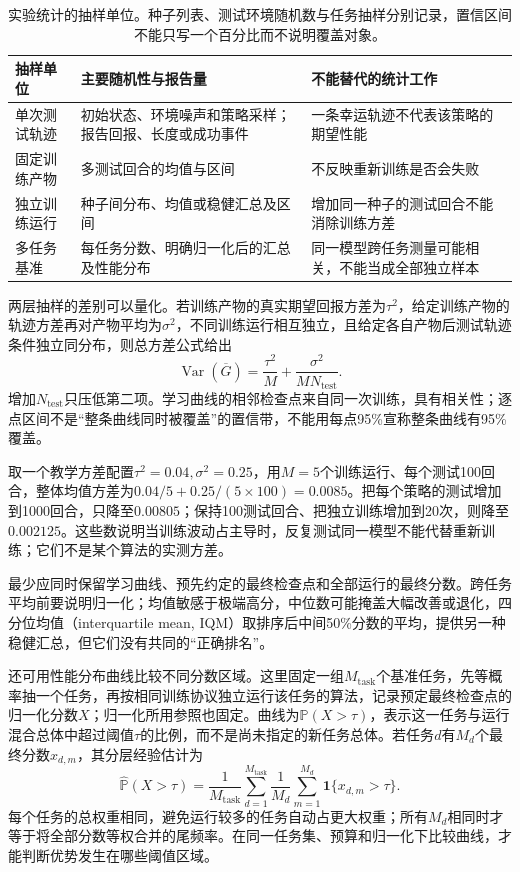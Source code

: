 \begin{table}[t]
  \centering
  \small
  \begin{tabularx}{\linewidth}{>{\raggedright\arraybackslash}p{26mm} >{\raggedright\arraybackslash}X >{\raggedright\arraybackslash}X}
    \toprule
    抽样单位 & 主要随机性与报告量 & 不能替代的统计工作 \\
    \midrule
    单次测试轨迹 & 初始状态、环境噪声和策略采样；报告回报、长度或成功事件 & 一条幸运轨迹不代表该策略的期望性能 \\
    固定训练产物 & 多测试回合的均值与区间 & 不反映重新训练是否会失败 \\
    独立训练运行 & 种子间分布、均值或稳健汇总及区间 & 增加同一种子的测试回合不能消除训练方差 \\
    多任务基准 & 每任务分数、明确归一化后的汇总及性能分布 & 同一模型跨任务测量可能相关，不能当成全部独立样本 \\
    \bottomrule
  \end{tabularx}
  \caption{实验统计的抽样单位。种子列表、测试环境随机数与任务抽样分别记录，置信区间不能只写一个百分比而不说明覆盖对象。}
  \label{tab:rl-learning-statistical-units}
\end{table}

两层抽样的差别可以量化。若训练产物的真实期望回报方差为$\tau^2$，给定训练产物的轨迹方差再对产物平均为$\sigma^2$，不同训练运行相互独立，且给定各自产物后测试轨迹条件独立同分布，则总方差公式给出
\[
 \operatorname{Var}(\overline G)
   =\frac{\tau^2}{M}
      +\frac{\sigma^2}{M N_{\mathrm{test}}}.
\]
增加$N_{\mathrm{test}}$只压低第二项。学习曲线的相邻检查点来自同一次训练，具有相关性；逐点区间不是“整条曲线同时被覆盖”的置信带，不能用每点95\%宣称整条曲线有95\%覆盖。

取一个教学方差配置$\tau^2=0.04,\sigma^2=0.25$，用$M=5$个训练运行、每个测试100回合，整体均值方差为$0.04/5+0.25/(5\times100)=0.0085$。把每个策略的测试增加到1000回合，只降至$0.00805$；保持100测试回合、把独立训练增加到20次，则降至$0.002125$。这些数说明当训练波动占主导时，反复测试同一模型不能代替重新训练；它们不是某个算法的实测方差。

最少应同时保留学习曲线、预先约定的最终检查点和全部运行的最终分数。跨任务平均前要说明归一化；均值敏感于极端高分，中位数可能掩盖大幅改善或退化，四分位均值（interquartile mean, IQM）取排序后中间50\%分数的平均，提供另一种稳健汇总，但它们没有共同的“正确排名”。

还可用性能分布曲线比较不同分数区域。这里固定一组$M_{\mathrm{task}}$个基准任务，先等概率抽一个任务，再按相同训练协议独立运行该任务的算法，记录预定最终检查点的归一化分数$X$；归一化所用参照也固定。曲线为$\mathbb P(X>\tau)$，表示这一任务与运行混合总体中超过阈值$\tau$的比例，而不是尚未指定的新任务总体。若任务$d$有$M_d$个最终分数$x_{d,m}$，其分层经验估计为
\[
  \widehat{\mathbb P}(X>\tau)
    =\frac{1}{M_{\mathrm{task}}}\sum_{d=1}^{M_{\mathrm{task}}}\frac1{M_d}
       \sum_{m=1}^{M_d}\mathbf1\{x_{d,m}>\tau\}.
\]
每个任务的总权重相同，避免运行较多的任务自动占更大权重；所有$M_d$相同时才等于将全部分数等权合并的尾频率。在同一任务集、预算和归一化下比较曲线，才能判断优势发生在哪些阈值区域。

